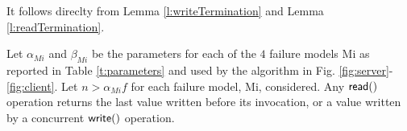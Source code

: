 \begin{proofT}
	It follows direclty from Lemma \ref{l:writeTermination} and Lemma \ref{l:readTermination}.
	\renewcommand{\toto}{t:termination}
\end{proofT}

\begin{theorem}[Validity]\label{t:validity}
Let $\alpha_{Mi}$ and $\beta_{Mi}$ be the parameters for each of the $4$ failure models Mi as reported in Table \ref{t:parameters} and used by the algorithm in Fig. \ref{fig:server}-\ref{fig:client}.
Let $n > \alpha_{Mi} f$ for each failure model, Mi, considered. 
Any ${\sf read}()$ operation returns the last value written before its invocation, or a value written by a concurrent ${\sf write}()$ operation. 
\end{theorem}

